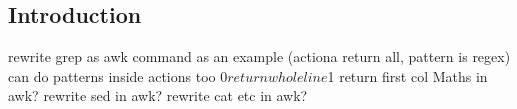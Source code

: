 
\subsection{Introduction}

rewrite grep as awk command as an example (actiona return all, pattern is regex)
can do patterns inside actions too
$0 return whole line
$1 return first col
Maths in awk?
rewrite sed in awk?
rewrite cat etc in awk?


